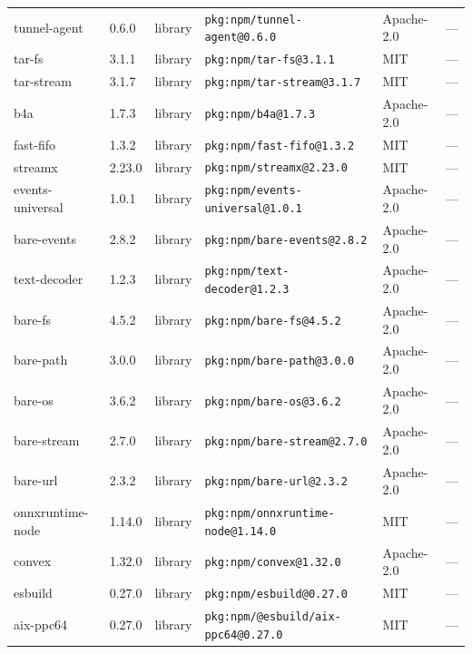 \documentclass[11pt,a4paper]{article}
\begin{document}
\begin{longtable}{|p{4cm}|p{2cm}|p{1.6cm}|p{5cm}|p{1.5cm}|p{3.5cm}|}
\raggedright tunnel-agent & 0.6.0 & library & \small\texttt{pkg:npm/tunnel-agent@0.6.0} & Apache-2.0 & \small — \\
\raggedright tar-fs & 3.1.1 & library & \small\texttt{pkg:npm/tar-fs@3.1.1} & MIT & \small — \\
\raggedright tar-stream & 3.1.7 & library & \small\texttt{pkg:npm/tar-stream@3.1.7} & MIT & \small — \\
\raggedright b4a & 1.7.3 & library & \small\texttt{pkg:npm/b4a@1.7.3} & Apache-2.0 & \small — \\
\raggedright fast-fifo & 1.3.2 & library & \small\texttt{pkg:npm/fast-fifo@1.3.2} & MIT & \small — \\
\raggedright streamx & 2.23.0 & library & \small\texttt{pkg:npm/streamx@2.23.0} & MIT & \small — \\
\raggedright events-universal & 1.0.1 & library & \small\texttt{pkg:npm/events-universal@1.0.1} & Apache-2.0 & \small — \\
\raggedright bare-events & 2.8.2 & library & \small\texttt{pkg:npm/bare-events@2.8.2} & Apache-2.0 & \small — \\
\raggedright text-decoder & 1.2.3 & library & \small\texttt{pkg:npm/text-decoder@1.2.3} & Apache-2.0 & \small — \\
\raggedright bare-fs & 4.5.2 & library & \small\texttt{pkg:npm/bare-fs@4.5.2} & Apache-2.0 & \small — \\
\raggedright bare-path & 3.0.0 & library & \small\texttt{pkg:npm/bare-path@3.0.0} & Apache-2.0 & \small — \\
\raggedright bare-os & 3.6.2 & library & \small\texttt{pkg:npm/bare-os@3.6.2} & Apache-2.0 & \small — \\
\raggedright bare-stream & 2.7.0 & library & \small\texttt{pkg:npm/bare-stream@2.7.0} & Apache-2.0 & \small — \\
\raggedright bare-url & 2.3.2 & library & \small\texttt{pkg:npm/bare-url@2.3.2} & Apache-2.0 & \small — \\
\raggedright onnxruntime-node & 1.14.0 & library & \small\texttt{pkg:npm/onnxruntime-node@1.14.0} & MIT & \small — \\
\raggedright convex & 1.32.0 & library & \small\texttt{pkg:npm/convex@1.32.0} & Apache-2.0 & \small — \\
\raggedright esbuild & 0.27.0 & library & \small\texttt{pkg:npm/esbuild@0.27.0} & MIT & \small — \\
\raggedright aix-ppc64 & 0.27.0 & library & \small\texttt{pkg:npm/@esbuild/aix-ppc64@0.27.0} & MIT & \small — \\

\end{longtable}
\end{document}
